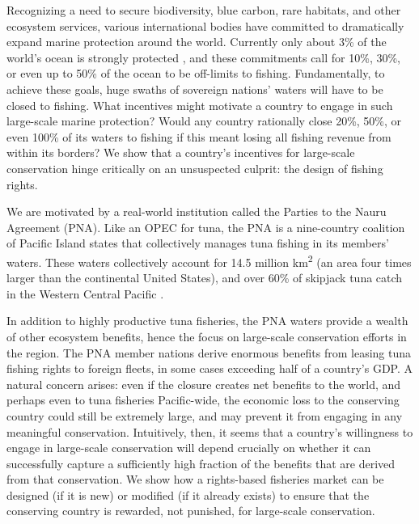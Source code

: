 \documentclass[12pt]{article}
\begin{document}



Recognizing a need to secure biodiversity, blue carbon, rare habitats, and other ecosystem services, various international bodies have committed to dramatically expand marine protection around the world. Currently only about 3\% of the world's ocean is strongly protected \cite{sala_2018}, and these commitments call for 10\%, 30\%, or even up to 50\% of the ocean to be off-limits to fishing. Fundamentally, to achieve these goals, huge swaths of sovereign nations' waters will have to be closed to fishing. What incentives might motivate a country to engage in such large-scale marine protection? Would any country rationally close 20\%, 50\%, or even 100\% of its waters to fishing if this meant losing all fishing revenue from within its borders? We show that a country's incentives for large-scale conservation hinge critically on an unsuspected culprit: the design of fishing rights.

We are motivated by a real-world institution called the Parties to the Nauru Agreement (PNA). Like an OPEC for tuna, the PNA is a nine-country coalition of Pacific Island states that collectively manages tuna fishing in its members' waters\cite{havice_2013,aqorau_2018}. These waters collectively account for 14.5 million km\textsuperscript{2} (an area four times larger than the continental United States), and over 60\% of skipjack tuna catch in the Western Central Pacific \cite{havice_2013}.

In addition to highly productive tuna fisheries, the PNA waters provide a wealth of other ecosystem benefits, hence the focus on large-scale conservation efforts in the region. The PNA member nations derive enormous benefits from leasing tuna fishing rights to foreign fleets, in some cases exceeding half of a country's GDP. A natural concern arises: even if the closure creates net benefits to the world, and perhaps even to tuna fisheries Pacific-wide, the economic loss to the conserving country could still be extremely large, and may prevent it from engaging in any meaningful conservation. Intuitively, then, it seems that a country's willingness to engage in large-scale conservation will depend crucially on whether it can successfully capture a sufficiently high fraction of the benefits that are derived from that conservation. We show how a rights-based fisheries market can be designed (if it is new) or modified (if it already exists) to ensure that the conserving country is rewarded, not punished, for large-scale conservation.
\end{document}
